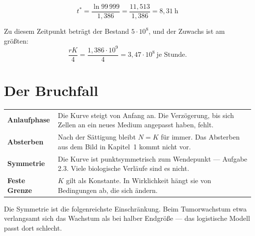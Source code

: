 \begin{merksatz}
\[ t^{*} = \frac{\ln 99\,999}{1{,}386} = \frac{11{,}513}{1{,}386} = 8{,}31\ \text{h} \]

Zu diesem Zeitpunkt beträgt der Bestand $5\cdot10^8$, und der Zuwachs ist am größten:
\[ \frac{rK}{4} = \frac{1{,}386\cdot10^9}{4} = 3{,}47\cdot10^{8} \ \text{je Stunde} . \]

\begin{center}
\begin{minipage}{0.88\textwidth}
\end{minipage}
\end{center}
\end{merksatz}

\section{Der Bruchfall}

\begin{warnung}
\begin{center}
{\small
\renewcommand{\arraystretch}{1.52}
\begin{tabular}{@{}P{2.6cm}P{6.0cm}@{}}
\toprule
\textbf{Anlaufphase} & Die Kurve steigt von Anfang an. Die Verzögerung, bis sich Zellen an ein neues Medium angepasst haben, fehlt.\\
\textbf{Absterben} & Nach der Sättigung bleibt $N = K$ für immer. Das Absterben aus dem Bild in Kapitel~1 kommt nicht vor.\\
\textbf{Symmetrie} & Die Kurve ist punktsymmetrisch zum Wendepunkt --- Aufgabe 2.3. Viele biologische Verläufe sind es nicht.\\
\textbf{Feste Grenze} & $K$ gilt als Konstante. In Wirklichkeit hängt sie von Bedingungen ab, die sich ändern.\\
\bottomrule
\end{tabular}}
\end{center}

Die Symmetrie ist die folgenreichste Einschränkung. Beim Tumorwachstum etwa verlangsamt sich das Wachstum  als bei halber Endgröße --- das logistische Modell passt dort schlecht.

\begin{center}
\begin{minipage}{0.88\textwidth}
\end{minipage}
\end{center}
\end{warnung}

